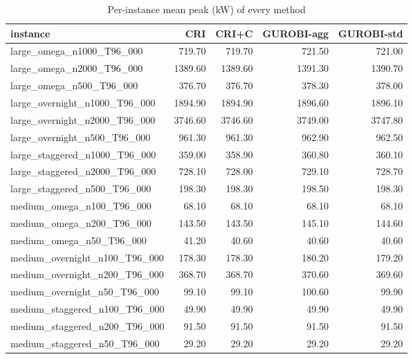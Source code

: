 \begin{table}[htbp]
\centering
\small
\caption{Per-instance mean peak (kW) of every method}
\label{tab:E3_long_runs_b600_per_instance}
\begin{tabular}{lrrrr}
\toprule
instance & CRI & CRI+C & GUROBI-agg & GUROBI-std \\
\midrule
large\_omega\_n1000\_T96\_000 & 719.70 & 719.70 & 721.50 & 721.00 \\
large\_omega\_n2000\_T96\_000 & 1389.60 & 1389.60 & 1391.30 & 1390.70 \\
large\_omega\_n500\_T96\_000 & 376.70 & 376.70 & 378.30 & 378.00 \\
large\_overnight\_n1000\_T96\_000 & 1894.90 & 1894.90 & 1896.60 & 1896.10 \\
large\_overnight\_n2000\_T96\_000 & 3746.60 & 3746.60 & 3749.00 & 3747.80 \\
large\_overnight\_n500\_T96\_000 & 961.30 & 961.30 & 962.90 & 962.50 \\
large\_staggered\_n1000\_T96\_000 & 359.00 & 358.90 & 360.80 & 360.10 \\
large\_staggered\_n2000\_T96\_000 & 728.10 & 728.00 & 729.10 & 728.70 \\
large\_staggered\_n500\_T96\_000 & 198.30 & 198.30 & 198.50 & 198.30 \\
medium\_omega\_n100\_T96\_000 & 68.10 & 68.10 & 68.10 & 68.10 \\
medium\_omega\_n200\_T96\_000 & 143.50 & 143.50 & 145.10 & 144.60 \\
medium\_omega\_n50\_T96\_000 & 41.20 & 40.60 & 40.60 & 40.60 \\
medium\_overnight\_n100\_T96\_000 & 178.30 & 178.30 & 180.20 & 179.20 \\
medium\_overnight\_n200\_T96\_000 & 368.70 & 368.70 & 370.60 & 369.60 \\
medium\_overnight\_n50\_T96\_000 & 99.10 & 99.10 & 100.60 & 99.90 \\
medium\_staggered\_n100\_T96\_000 & 49.90 & 49.90 & 49.90 & 49.90 \\
medium\_staggered\_n200\_T96\_000 & 91.50 & 91.50 & 91.50 & 91.50 \\
medium\_staggered\_n50\_T96\_000 & 29.20 & 29.20 & 29.20 & 29.20 \\
\bottomrule
\end{tabular}
\end{table}
